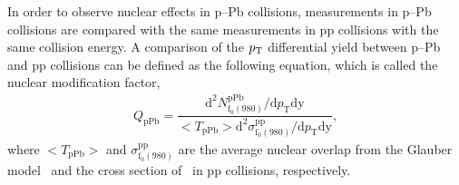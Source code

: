 \documentclass[ALICE,manyauthors]{cernphprep}
\begin{document}
In order to observe nuclear effects in p--Pb collisions, measurements in p--Pb collisions are compared with the same measurements in pp collisions with the same collision energy. A comparison of the $p_{\rm{T}}$ differential yield between p--Pb and pp collisions can be defined as the following equation, which is called the nuclear modification factor,
\begin{eqnarray}
Q_{\mathrm{pPb}} = \dfrac{\mathrm{d}^{2} N_{\mathrm{f}_{0}(980)}^{\mathrm{pPb}} / \mathrm{d} p_{\mathrm{T}} \mathrm{dy} }{ <T_{\mathrm{pPb}}> \mathrm{d}^{2} \sigma_{\mathrm{f}_{0}(980)}^{\mathrm{pp}}/ \mathrm{d} p_{\mathrm{T}} \mathrm{dy} },
\end{eqnarray}
where $<T_{\mathrm{pPb}}>$ and $\sigma_{\mathrm{f}_{0}(980)}^{\mathrm{pp}}$ are the average nuclear overlap from the Glauber model~\cite{Miller:2007ri} and the cross section of \fzero~in pp collisions, respectively. 
   




\clearpage

\begin{figure}[b!]
	\centering
	\caption{ }
	\label{fig:SigExt}
\end{figure}
\end{document}
